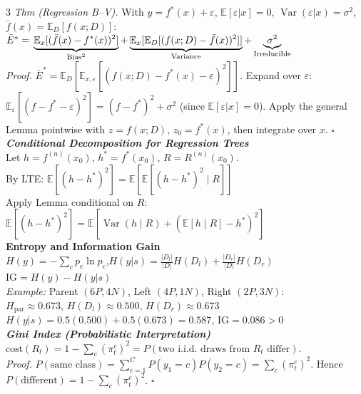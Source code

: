 \documentclass[a4paper,7pt]{article}
\begin{document}
\begin{multicols*}{3}
\textit{Thm (Regression B--V).} With $y=f^*(x)+\varepsilon$, $\mathbb{E}[\varepsilon|x]=0$, $\operatorname{Var}(\varepsilon|x)=\sigma^2$, $\bar f(x)=\mathbb{E}_D[f(x;D)]$:
$\bar E^*=\\\underbrace{\mathbb{E}_x[(\bar f(x)-f^*(x))^2]}_{\text{Bias}^2}+\underbrace{\mathbb{E}_x[\mathbb{E}_D[(f(x;D)-\bar f(x))^2]]}_{\text{Variance}}+\underbrace{\sigma^2}_{\text{Irreducible}}$\\
\textit{Proof.} $\bar E^*=\mathbb{E}_D[\mathbb{E}_{x,\varepsilon}[(f(x;D)-f^*(x)-\varepsilon)^2]]$. Expand over $\varepsilon$: $\mathbb{E}_\varepsilon[(f-f^*-\varepsilon)^2]=(f-f^*)^2+\sigma^2$ (since $\mathbb{E}[\varepsilon|x]=0$). Apply the general Lemma pointwise with $z=f(x;D)$, $z_0=f^*(x)$, then integrate over $x$. \hfill$\square$\\

\textit{\textbf{Conditional Decomposition for Regression Trees}}\\
Let $h=f^{(n)}(x_0)$, $h^*=f^*(x_0)$, $R=R^{(n)}(x_0)$.\\
By LTE: $\mathbb{E}[(h-h^*)^2]=\mathbb{E}[\mathbb{E}[(h-h^*)^2\mid R]]$\\
Apply Lemma conditional on $R$:\\
$\mathbb{E}[(h-h^*)^2]=\mathbb{E}\!\left[\operatorname{Var}(h\mid R)+(\mathbb{E}[h\mid R]-h^*)^2\right]$\\

\textbf{Entropy and Information Gain}\\
$H(y)=-\sum_c p_c\ln p_c$,\quad $H(y|s)=\tfrac{|D_l|}{|D|}H(D_l)+\tfrac{|D_r|}{|D|}H(D_r)$\\
$\mathrm{IG}=H(y)-H(y|s)$\\
\textit{Example:} Parent $(6P,4N)$, Left $(4P,1N)$, Right $(2P,3N)$:\\
$H_\text{par}\approx0.673$, $H(D_l)\approx0.500$, $H(D_r)\approx0.673$\\
$H(y|s)=0.5(0.500)+0.5(0.673)=0.587$, $\mathrm{IG}=0.086>0$\\

\textit{\textbf{Gini Index (Probabilistic Interpretation)}}\\
$\mathrm{cost}(R_t)=1-\sum_c(\pi_t^c)^2=P(\text{two i.i.d.\ draws from }R_t\text{ differ})$.\\
\textit{Proof.} $P(\text{same class})=\sum_{c=1}^C P(y_1=c)P(y_2=c)=\sum_c(\pi_t^c)^2$. Hence $P(\text{different})=1-\sum_c(\pi_t^c)^2$. \hfill$\square$\\


\end{multicols*}
\end{document}
